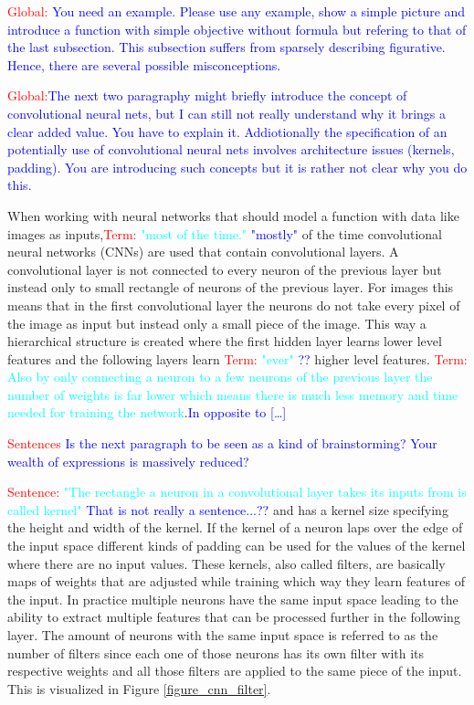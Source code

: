 \textcolor{red}{Global:} \textcolor{cyan}{} \textcolor{blue}{You need an example. Please use any example, show a simple picture and introduce a function with simple objective without formula but refering to that of the last subsection. This subsection suffers from sparsely describing figurative. Hence, there are several possible misconceptions.}

\textcolor{red}{Global:}\textcolor{blue}{The next two paragraphy might briefly introduce the concept of convolutional neural nets, but I can still not really understand why it brings a clear added value. You have to explain it. Addiotionally the specification of an potentially use of convolutional neural nets involves architecture issues (kernels, padding). You are introducing such concepts but it is rather not clear why you do this.}


When working with neural networks that should model a function with data like images as inputs,\textcolor{red}{Term:} \textcolor{cyan}{"most of the time."} \textcolor{blue}{"mostly"}
of the time convolutional neural networks (CNNs) are used that contain convolutional layers. A 
convolutional layer is not connected to every neuron of the previous layer but instead only to small
rectangle of neurons of the previous layer. For images this means that in the first convolutional layer
the neurons do not take every pixel of the image as input but instead only a small piece of the image.
This way a hierarchical structure is created where the first hidden layer learns lower level features
and the following layers learn \textcolor{red}{Term:} \textcolor{cyan}{"ever"} \textcolor{blue}{??} higher level features.  \textcolor{red}{Term:} \textcolor{cyan}{Also by only connecting a neuron to a few
neurons of the previous layer the number of weights is far lower which means there is much less memory
and time needed for training the network}.\textcolor{blue}{In opposite to [\dots]}

\textcolor{red}{Sentences} \textcolor{blue}{Is the next paragraph to be seen as a kind of brainstorming? Your wealth of expressions is massively reduced?}

\textcolor{red}{Sentence:} \textcolor{cyan}{"The rectangle a neuron in a convolutional layer takes its inputs from is called kernel"} \textcolor{blue}{That is not really a sentence...??} and has a
kernel size specifying the height and width of the kernel. If the kernel of a neuron laps over the edge
of the input space different kinds of padding can be used for the values of the kernel where there
are no input values. These kernels, also called filters, are basically maps of weights that are
adjusted while training which way they learn features of the input. In practice multiple neurons have
the same input space leading to the ability to extract multiple features that can be processed
further in the following layer. The amount of neurons with the same input space is referred to as
the number of filters since each one of those neurons has its own filter with its respective
weights and all those filters are applied to the same piece of the input. This is visualized in
Figure \ref{figure_cnn_filter}.


